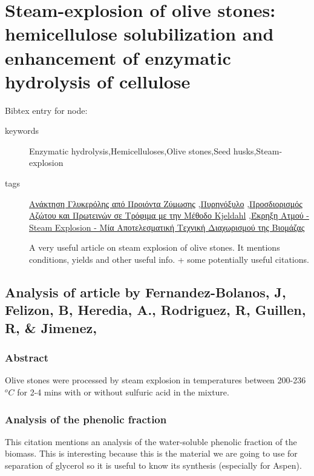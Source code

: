 \documentclass[11pt]{article}
\begin{document}
\section{Steam-explosion of olive stones: hemicellulose solubilization and enhancement of enzymatic hydrolysis of cellulose}
\label{sec:org79132bf}
Bibtex entry for node: \cite{fernandez-bolanosSteamexplosionOliveStones2001}

\begin{description}
\item[{keywords}] Enzymatic hydrolysis,Hemicelluloses,Olive stones,Seed husks,Steam-explosion
\item[{tags}] \href{\detokenize{../../../../org_roam/ανακτηση_γλυκερολης_απο_προιοντα_ζυμωσης-07-11-22.org}}{Ανάκτηση Γλυκερόλης από Προιόντα Ζύμωσης} ,\href{\detokenize{../../../../org_roam/πυρηνοξυλο-08-11-22.org}}{Πυρηνόξυλο} ,\href{\detokenize{../../../../org_roam/προσδιορισμος_αζωτου_και_πρωτεινων_σε_τροφιμα_με_την_μεθοδο_kjeldahl-09-03-22.org}}{Προσδιορισμός Αζώτου και Πρωτεινών σε Τρόφιμα με την Μέθοδο Kjeldahl} ,\href{\detokenize{../../../../org_roam/εκρηξη_ατμου_steam_explosion_μια_αποτελεσματικη_τεχνικη_διαχωρισμου_της_βιομαζας-08-11-22.org}}{Έκρηξη Ατμού - Steam Explosion - Μία Αποτελεσματική Τεχνική Διαχωρισμού της Βιομάζας} 

A very useful article on steam explosion of olive stones. It mentions conditions, yields and other useful info. + some potentially useful citations.
\end{description}
\subsection{Analysis of article by Fernandez-Bolanos, J, Felizon, B, Heredia, A., Rodriguez, R, Guillen, R, \& Jimenez,}
\label{sec:org9da38c7}
\subsubsection{Abstract}
\label{sec:org7a38fa4}
Olive stones were processed by steam explosion in temperatures between 200-236 \(^oC\) for 2-4 mins with or without sulfuric acid in the mixture.
\subsubsection{Analysis of the phenolic fraction}
\label{sec:orgde75d48}
This citation mentions an analysis of the water-soluble phenolic fraction of the biomass. This is interesting because this is the material we are going to use for separation of glycerol so it is useful to know its synthesis (especially for Aspen).
\end{document}
